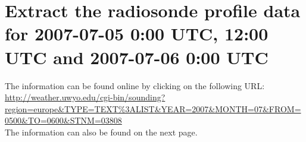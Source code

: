 \documentclass{article}
\begin{document}
\section{Extract the radiosonde profile data for 2007-07-05 0:00 UTC, 12:00 UTC and 2007-07-06 0:00 UTC}
The information can be found online by clicking on the following URL:\\
\url{http://weather.uwyo.edu/cgi-bin/sounding?region=europe\&TYPE=TEXT%3ALIST&YEAR=2007&MONTH=07&FROM=0500&TO=0600&STNM=03808}\\

The information can also be found on the next page.
\end{document}
